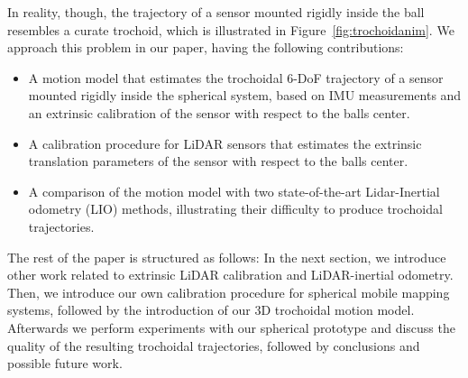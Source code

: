 In reality, though, the trajectory of a sensor mounted rigidly inside the ball resembles a curate trochoid, which is illustrated in Figure~\ref{fig:trochoidanim}.
We approach this problem in our paper, having the following contributions:
\begin{itemize}
  \item A motion model that estimates the trochoidal 6-DoF trajectory of a sensor mounted rigidly inside the spherical system, based on IMU measurements and an extrinsic calibration of the sensor with respect to the balls center.
  \item A calibration procedure for LiDAR sensors that estimates the extrinsic translation parameters of the sensor with respect to the balls center.
  \item A comparison of the motion model with two state-of-the-art Lidar-Inertial odometry (LIO) methods, illustrating their difficulty to produce trochoidal trajectories.
\end{itemize}
The rest of the paper is structured as follows: 
In the next section, we introduce other work related to extrinsic LiDAR calibration and LiDAR-inertial odometry.
Then, we introduce our own calibration procedure for spherical mobile mapping systems, followed by the introduction of our 3D trochoidal motion model.
Afterwards we perform experiments with our spherical prototype and discuss the quality of the resulting trochoidal trajectories, followed by conclusions and possible future work.

 